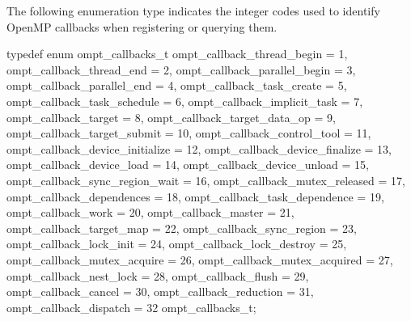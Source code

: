 The following enumeration type indicates the integer codes used to identify
OpenMP callbacks when registering or querying them.


\begin{ccppspecific}
\begin{omptEnum}
typedef enum ompt_callbacks_t {
  ompt_callback_thread_begin             = 1,
  ompt_callback_thread_end               = 2,
  ompt_callback_parallel_begin           = 3,
  ompt_callback_parallel_end             = 4,
  ompt_callback_task_create              = 5,
  ompt_callback_task_schedule            = 6,
  ompt_callback_implicit_task            = 7,
  ompt_callback_target                   = 8,
  ompt_callback_target_data_op           = 9,
  ompt_callback_target_submit            = 10,
  ompt_callback_control_tool             = 11,
  ompt_callback_device_initialize        = 12,
  ompt_callback_device_finalize          = 13,
  ompt_callback_device_load              = 14,
  ompt_callback_device_unload            = 15,
  ompt_callback_sync_region_wait         = 16,
  ompt_callback_mutex_released           = 17,
  ompt_callback_dependences              = 18,
  ompt_callback_task_dependence          = 19,
  ompt_callback_work                     = 20,
  ompt_callback_master                   = 21,
  ompt_callback_target_map               = 22,
  ompt_callback_sync_region              = 23,
  ompt_callback_lock_init                = 24,
  ompt_callback_lock_destroy             = 25,
  ompt_callback_mutex_acquire            = 26,
  ompt_callback_mutex_acquired           = 27,
  ompt_callback_nest_lock                = 28,
  ompt_callback_flush                    = 29,
  ompt_callback_cancel                   = 30,
  ompt_callback_reduction                = 31,
  ompt_callback_dispatch                 = 32
} ompt_callbacks_t;
\end{omptEnum}
\end{ccppspecific}



